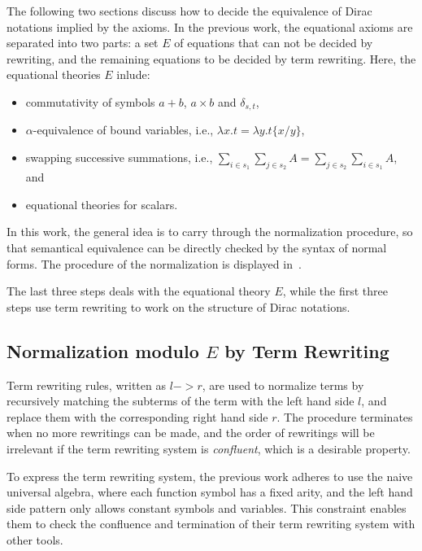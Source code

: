 \documentclass[runningheads]{llncs}
\begin{document}
The following two sections discuss how to decide the equivalence of Dirac notations implied by the axioms.
In the previous work, the equational axioms are separated into two parts: a set $E$ of equations that can not be decided by rewriting, and the remaining equations to be decided by term rewriting.
Here, the equational theories $E$ inlude:
\begin{itemize}
    \item commutativity of symbols $a + b$, $a\times b$ and $\delta_{s, t}$,
    \item $\alpha$-equivalence of bound variables, i.e., $\lambda x.t = \lambda y . t\{x/y\}$,
    \item swapping successive summations, i.e., $\sum_{i \in s_1} \sum_{j \in s_2} A = \sum_{j \in s_2} \sum_{i \in s_1}A$, and
    \item equational theories for scalars.
\end{itemize}

In this work, the general idea is to carry through the normalization procedure, so that semantical equivalence can be directly checked by the syntax of normal forms. The procedure of the normalization is displayed in~.



The last three steps deals with the equational theory $E$, while the first three steps use term rewriting to work on the structure of Dirac notations.


\subsection{Normalization modulo $E$ by Term Rewriting}
Term rewriting rules, written as $l -> r$, are used to normalize terms by recursively matching the subterms of the term with the left hand side $l$, and replace them with the corresponding right hand side $r$. The procedure terminates when no more rewritings can be made, and the order of rewritings will be irrelevant if the term rewriting system is \textit{confluent}, which is a desirable property.

To express the term rewriting system, the previous work adheres to use the naive universal algebra, where each function symbol has a fixed arity, and the left hand side pattern only allows constant symbols and variables. This constraint enables them to check the confluence and termination of their term rewriting system with other tools.

\end{document}

